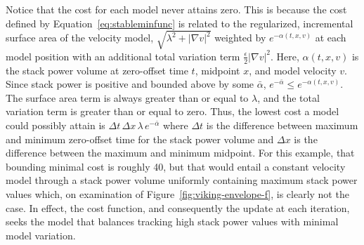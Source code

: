 Notice that the cost for each model never attains zero.  This is because the cost defined by Equation~\ref{eq:stableminfunc} is related to the regularized, incremental surface area of the velocity model, $\sqrt{\lambda^2+\left|\nabla v\right|^2}$ weighted by $e^{-\alpha(t,x,v)}$ at each model position with an additional total variation term $\frac{\epsilon}{2}\left|\nabla v\right|^2$.  Here, $\alpha(t,x,v)$ is the stack power volume at zero-offset time $t$, midpoint $x$, and model velocity $v$.  Since stack power is positive and bounded above by some $\bar{\alpha}$, $e^{-\bar{\alpha}} \leq e^{-\alpha(t,x,v)}$. The surface area term is always greater than or equal to $\lambda$, and the total variation term is greater than or equal to zero.  Thus, the lowest cost a model could possibly attain is $ \Delta t \, \Delta x \, \lambda \, e^{-\bar{\alpha}}$ where $\Delta t$ is the difference between maximum and minimum zero-offset time for the stack power volume and $\Delta x$ is the difference between the maximum and minimum midpoint.  For this example, that bounding minimal cost is roughly 40, but that would entail a constant velocity model through a stack power volume uniformly containing maximum stack power values which, on examination of Figure~\ref{fig:viking-envelope-f}, is clearly not the case.  In effect, the cost function, and consequently the update at each iteration, seeks the model that balances tracking high stack power values with minimal model variation.




